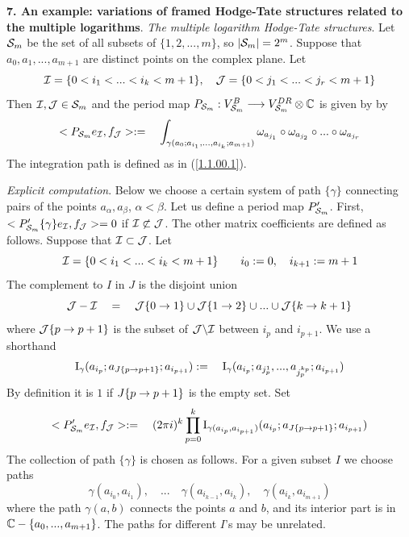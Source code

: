 \documentclass[10pt]{article}
\begin{document}
{\bf 7.  An example:  variations of framed Hodge-Tate structures related to  the 
multiple logarithms}. 
{\it The multiple logarithm Hodge-Tate structures}. 
Let  
${\cal S}_m$ be the set of all subsets of $\{1, 2, ..., m\}$, 
so $|{\cal S}_m|=2^m$. 
Suppose that $a_0, a_1, ... , a_{m+1}$ are distinct points on the complex plane. Let 
$$
{\cal I} = \{0 < i_1 < ... < i_k < m+1\}, \quad 
{\cal J} = \{0 < j_1 < ... < j_r < m+1\}
$$ 
Then ${\cal I}, {\cal J} \in {\cal S}_m$ and the period map 
$P_{{\cal S}_m}: V^B_{{\cal S}_m} \longrightarrow V_{{\cal S}_m}^{DR} \otimes {\mathbb C}$ is given by by
\begin{equation} \label{12.29.00.4}
 <P_{{\cal S}_m} e_{\cal I}, f_{\cal J}> := \quad \int_{\gamma(a_0; a_{i_1}, ..., a_{i_k}; a_{m+1})} 
\omega_{a_{j_1}} \circ \omega_{a_{j_2}} \circ  ... \circ 
\omega_{a_{j_r}} 
\end{equation}
The integration path is defined as in (\ref{1.1.00.1}). 
 

{\it Explicit computation}. 
Below we choose a certain system of path $\{\gamma\}$ connecting pairs of the points 
$a_{\alpha}, a_{\beta}$, $\alpha < \beta$. Let us 
define a period map 
${P}'_{{\cal S}_m}$. First, 
$<{P}'_{{\cal S}_m}{\{\gamma\}}e_{\cal I}, f_{\cal J}>
 =0$ if ${\cal I} \not \subset {\cal J}$. 
The other matrix coefficients are defined as follows. 
Suppose that ${\cal I} \subset {\cal J}$. Let 
\begin{equation} \label{4.17.01.1}
{\cal I} = \{0 < i_1 < ... < i_k < m+1\}\qquad i_0 := 0, \quad i_{k+1}:= m+1
 \end{equation}
The complement to $I$ in $J$ is the disjoint union 
$$
{\cal J} - {\cal I} \quad = \quad {\cal J}{\{0\rightarrow1\}} \cup {\cal J}{\{1\rightarrow2\}} \cup  ... \cup  
{\cal J}{\{k\rightarrow k+1\}}  
$$
where ${\cal J}{\{p \rightarrow p+1\}}$ is the subset of  $ {\cal J}\backslash {\cal I}$ 
between $i_p $ and $i_{p+1}$. 
We  use a shorthand
$$
{\rm I}_{\gamma}(a_{i_p}; a_{J{\{p \rightarrow p+1 \}}}; a_{i_{p+1}}):=  \quad 
{\rm I}_{\gamma}(a_{i_p}; a_{j_{p}^1}, ..., a_{j_{p}^{k_p}}; a_{i_{p+1}})
$$ 
By definition it is  $1$  if 
$J{\{p \rightarrow p+1\}}$ is the empty set. Set
\begin{equation} \label{yCO0}
<{P}'_{{\cal S}_m} e_{{\cal I}}, f_{\cal J}> := \quad (2\pi i)^{k} \prod_{p=0}^k
{\rm I}_{\gamma(a_{i_p}, a_{i_{p+1}})}(a_{i_p}; a_{J{\{p \rightarrow p+1}\}}; a_{i_{p+1}})
\end{equation}
The collection of path ${\{\gamma\}}$ is chosen as follows. 
For a given subset $I$ we choose  paths 
$$
\gamma(a_{i_{0}}, a_{i_{1}}), \quad ... \quad \gamma(a_{i_{k-1}}, a_{i_{k}}), 
\quad \gamma(a_{i_k}, a_{i_{m+1}})
$$
where the path $\gamma(a,b)$ connects the points $a$ and $b$, and its interior 
part is in 
${\mathbb C} - \{a_0, ..., a_{m+1}\}$. 
The paths for different $I$'s may be unrelated. 
\end{document}
